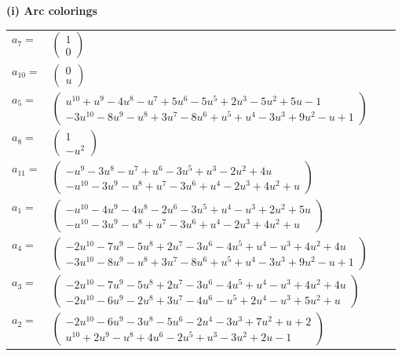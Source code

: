 \documentclass[1p]{elsarticle_modified}
\theoremstyle{definition}
\begin{document}
\flushleft \textbf{(i) Arc colorings}\\
\begin{tabular}{m{7pt} m{180pt} m{7pt} m{180pt} }
\flushright $a_{7}=$&$\begin{pmatrix}1\\0\end{pmatrix}$ \\
\flushright $a_{10}=$&$\begin{pmatrix}0\\u\end{pmatrix}$ \\
\flushright $a_{5}=$&$\begin{pmatrix}u^{10}+u^9-4 u^8- u^7+5 u^6-5 u^5+2 u^3-5 u^2+5 u-1\\-3 u^{10}-8 u^9- u^8+3 u^7-8 u^6+u^5+u^4-3 u^3+9 u^2- u+1\end{pmatrix}$ \\
\flushright $a_{8}=$&$\begin{pmatrix}1\\- u^2\end{pmatrix}$ \\
\flushright $a_{11}=$&$\begin{pmatrix}- u^9-3 u^8- u^7+u^6-3 u^5+u^3-2 u^2+4 u\\- u^{10}-3 u^9- u^8+u^7-3 u^6+u^4-2 u^3+4 u^2+u\end{pmatrix}$ \\
\flushright $a_{1}=$&$\begin{pmatrix}- u^{10}-4 u^9-4 u^8-2 u^6-3 u^5+u^4- u^3+2 u^2+5 u\\- u^{10}-3 u^9- u^8+u^7-3 u^6+u^4-2 u^3+4 u^2+u\end{pmatrix}$ \\
\flushright $a_{4}=$&$\begin{pmatrix}-2 u^{10}-7 u^9-5 u^8+2 u^7-3 u^6-4 u^5+u^4- u^3+4 u^2+4 u\\-3 u^{10}-8 u^9- u^8+3 u^7-8 u^6+u^5+u^4-3 u^3+9 u^2- u+1\end{pmatrix}$ \\
\flushright $a_{3}=$&$\begin{pmatrix}-2 u^{10}-7 u^9-5 u^8+2 u^7-3 u^6-4 u^5+u^4- u^3+4 u^2+4 u\\-2 u^{10}-6 u^9-2 u^8+3 u^7-4 u^6- u^5+2 u^4- u^3+5 u^2+u\end{pmatrix}$ \\
\flushright $a_{2}=$&$\begin{pmatrix}-2 u^{10}-6 u^9-3 u^8-5 u^6-2 u^4-3 u^3+7 u^2+u+2\\u^{10}+2 u^9- u^8+4 u^6-2 u^5+u^3-3 u^2+2 u-1\end{pmatrix}$ \\

\end{tabular}
\end{document}
